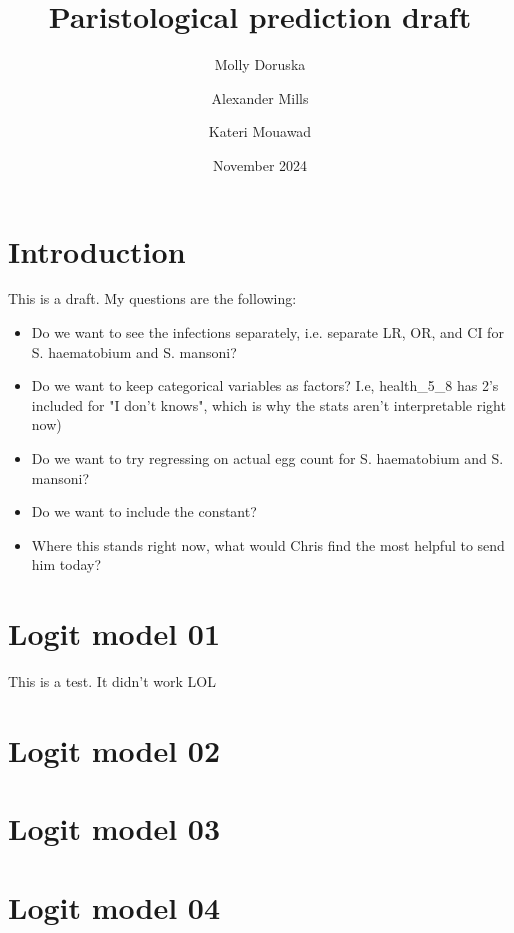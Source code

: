 \documentclass[12pt]{article}
\title{Paristological prediction draft}
\author{ Molly Doruska \and Alexander Mills \and Kateri Mouawad}
\date{\vspace{1ex}November 2024}
\begin{document}
\maketitle

\section{Introduction}
This is a draft. My questions are the following:
\begin{itemize}
    \item Do we want to see the infections separately, i.e. separate LR, OR, and CI for S. haematobium and S. mansoni?
    \item Do we want to keep categorical variables as factors? I.e, health\_5\_8 has 2's included for "I don't knows", which is why the stats aren't interpretable right now)
    \item Do we want to try regressing on actual egg count for S. haematobium and S. mansoni?
    \item Do we want to include the constant?
    \item Where this stands right now, what would Chris find the most helpful to send him today?
\end{itemize}
\tableofcontents 

\section{Logit model 01}




This is a test. It didn't work LOL



\clearpage
\section{Logit model 02}








\clearpage
\section{Logit model 03}








\clearpage
\section{Logit model 04}







\end{document}
